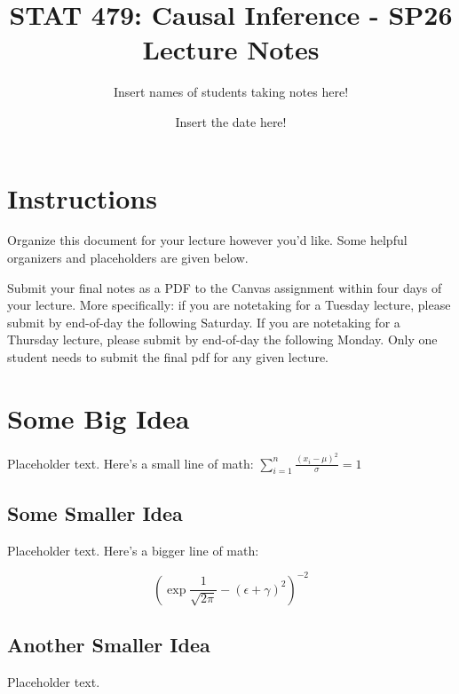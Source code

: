\documentclass{article}
\title{STAT 479: Causal Inference - SP26 Lecture Notes}
\author{Insert names of students taking notes here!}
\date{Insert the date here!}
\begin{document}
\maketitle

\section{Instructions}

Organize this document for your lecture however you'd like. Some helpful organizers and placeholders are given below.

Submit your final notes as a PDF to the Canvas assignment within four days of your lecture. More specifically: if you are notetaking for a Tuesday lecture, please submit by end-of-day the following Saturday. If you are notetaking for a Thursday lecture, please submit by end-of-day the following Monday. Only one student needs to submit the final pdf for any given lecture.

\section{Some Big Idea}

Placeholder text. Here's a small line of math: $\sum_{i=1}^n\frac{(x_i-\mu)^2}{\sigma} = 1$

\subsection{Some Smaller Idea}

Placeholder text. Here's a bigger line of math:

$$
\left(\exp{\frac{1}{\sqrt{2\pi}}} - (\epsilon + \gamma)^2\right)^{-2}
$$

\subsection{Another Smaller Idea}

Placeholder text.
\end{document}
